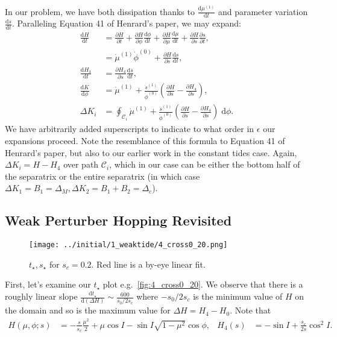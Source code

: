 \documentclass[11pt,
        usenames, %
        dvipsnames %
    ]{article}
\newcommand*{\rd}[2]{\frac{\mathrm{d}#1}{\mathrm{d}#2}}
\newcommand*{\pd}[2]{\frac{\partial#1}{\partial#2}}
\newcommand*{\p}[1]{\left(#1\right)}
\begin{document}
In our problem, we have both dissipation thanks to $\rd{\mu^{(1)}}{t}$ and
parameter variation $\rd{s}{t}$. Paralleling Equation 41 of Henrard's paper, we
may expand:
\begin{align}
    \rd{H}{t} &= \pd{H}{t} + \pd{H}{\phi}\rd{\phi}{t} + \pd{H}{\mu}\rd{\mu}{t}
            + \pd{H}{s}\pd{s}{t},\nonumber\\
        &= \dot{\mu}^{(1)} \dot{\phi}^{(0)} + \pd{H}{s}\rd{s}{t},\\
    \rd{H_4}{t} &= \pd{H_4}{s}\rd{s}{t},\\
    \rd{K}{\phi} &=
        \dot{\mu}^{(1)} + \frac{\dot{s}^{(1)}}{\dot{\phi}^{(0)}}
            \p{\pd{H}{s} - \pd{H_4}{s}},\\
    \Delta K_i &= \oint_{\mathcal{C}_i}
        \dot{\mu}^{(1)} + \frac{\dot{s}^{(1)}}{\dot{\phi}^{(0)}}
            \p{\pd{H}{s} - \pd{H_4}{s}}\;\mathrm{d}\phi.
\end{align}
We have arbitrarily added superscripts to indicate to what order in $\epsilon$
our expansions proceed. Note the resemblance of this formula to Equation 41 of
Henrard's paper, but also to our earlier work in the constant tides case. Again,
$\Delta K_i = H - H_4$ over path $\mathcal{C}_i$, which in our case can be either
the bottom half of the separatrix or the entire separatrix (in which case
$\Delta K_1 = B_1 = \Delta_M, \Delta K_2 = B_1 + B_2 = \Delta_c$).

\subsection{Weak Perturber Hopping Revisited}\label{ss:revisited}

\begin{figure}[t]
    \centering
    \texttt{[image: ../initial/1\_weaktide/4\_cross0\_20.png]}
    \caption{$t_\star, s_\star$ for $s_c = 0.2$. Red line is a by-eye linear
    fit.}\label{fig:4_cross0_20}
\end{figure}

First, let's examine our $t_{\star}$ plot e.g.\ \autoref{fig:4_cross0_20}. We
observe that there is a roughly linear slope $\rd{t_{\star}}{(\Delta H)} \sim
\frac{600}{s_0/2s_c}$ where $-s_0/2s_c$ is the minimum value of $H$ on the
domain and so is the maximum value for $\Delta H = H_4 - H_0$. Note that
\begin{align*}
    H(\mu, \phi; s) &= -\frac{s}{s_c}\frac{\mu^2}{2}
        + \mu \cos I - \sin I \sqrt{1 - \mu^2}\cos \phi,&
    H_4(s) &= -\sin I + \frac{s_c}{2s}\cos^2 I.
\end{align*}
\end{document}
